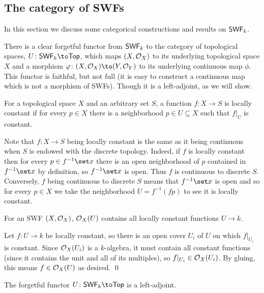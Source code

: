 \subsection{The category of SWFs}

In this section we discuss some categorical constructions and results on ${\sf SWF}_k$.

There is a clear forgetful functor from ${\sf SWF}_k$ to the category of topological spaces, $U\colon\SWF_k\to\Top$, which maps $(X,{{\cal O}}_X)$ to its underlying topological space $X$
and a morphism $\phi\colon(X,\O_X)\to(Y,\O_Y)$ to its underlying continuous map $\phi$.
This functor is faithful, but not full (it is easy to construct a continuous map which is not a morphism of SWFs).
Though it is a left-adjoint, as we will show.

\bdefn

    For a topological space $X$ and an arbitrary set $S$, a function $f\colon X\to S$ is {\emphcolor locally constant} if for every $p\in X$ there is a neighborhood
    $p\in U\subseteq X$ such that $f|_U$ is constant.

\edefn

Note that $f\colon X\to S$ being locally constant is the same as it being continuous when $S$ is endowed with the discrete topology.
Indeed, if $f$ is locally constant then for every $p\in f^{-1}\set x$ there is an open neighborhood of $p$ contained in $f^{-1}\set x$ by definition, so $f^{-1}\set x$ is open.
Thus $f$ is continuous to discrete $S$.
Conversely, $f$ being continuous to discrete $S$ means that $f^{-1}\set x$ is open and so for every $p\in X$ we take the neighborhood $U=f^{-1}(fp)$ to see it is locally constant.

\blemm

    For an SWF $(X,{{\cal O}}_X)$, ${{\cal O}}_X(U)$ contains all locally constant functions $U\to k$.

\elemm

\bproof

    Let $f\colon U\to k$ be locally constant, so there is an open cover $U_i$ of $U$ on which $f|_{U_i}$ is constant.
    Since ${{\cal O}}_X(U_i)$ is a $k$-algebra, it must contain all constant functions (since it contains the unit and all of its multiples), so $f|_{U_i}\in{{\cal O}}_X(U_i)$.
    By gluing, this means $f\in{{\cal O}}_X(U)$ as desired.
    \qed

\eproof

\bprop

    The forgetful functor $U\colon\SWF_k\to\Top$ is a left-adjoint.

